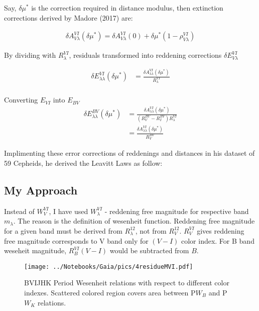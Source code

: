 \documentclass[12pt,a4paper]{article}
\begin{document}
Say, $\delta \mu ^*$ is the correction required in distance modulus, then extinction corrections derived by Madore (2017) are:

\begin{align*}
     \delta A^{VI}_{V \lambda} (\delta \mu^*) = \delta A_{V \lambda}^{VI}(0) + \delta \mu^*( 1 - \rho_{V \lambda}^{VI} )
\end{align*}

By dividing with $R_\lambda^{VI}$, residuals transformed into reddening corrections $\delta E_{V \lambda}^{VI}$

\begin{align*}
    \delta E_{\lambda \lambda}^{VI} (\delta \mu^*) & = \frac{\delta A_{\lambda \lambda}^{VI} (\delta \mu^*)}{R_\lambda^{VI}}\\
 \end{align*}
 
 Converting $E_{VI}$ into $E_{BV}$
 \begin{align*}
     \delta E_{\lambda \lambda}^{BV}(\delta \mu^*) & = \frac{\delta A_{\lambda \lambda}^{VI} (\delta \mu^*)}{({R^{BV}_V - R^{BV}_I})R_\lambda^{VI}} \\
     & = \frac{\delta A_{\lambda \lambda}^{VI}(\delta \mu^*)}{R^{BV}_V}  
 \end{align*}
 

Implimenting these error corrections of reddenings and distances in his dataset of 59 Cepheids, he derived the Leavitt Laws as  follow:

\subsection{My Approach}

Instead of $W_V^{VI}$, I have  used $W_\lambda^{VI}$ - reddening free magnitude for respective band $m_\lambda$. The reason is the definition of wesenheit function. 
Reddening free magnitude for a given band must be derived from $R_\lambda^{12}$, not from $R_V^{12}$. $R_V^{VI}$ gives reddening free 
magnitude corresponds to V band only for $(V-I)$ color index. For B band weseheit magnitude, $R_B^{VI}(V-I)$ would be subtracted from $B$. 

\begin{figure}
	\centering
	\vspace{-3.5cm}
	\texttt{[image: ../Notebooks/Gaia/pics/4residueMVI.pdf]}  
	\label{fig:del_delM}
	\caption{\small BVIJHK Period Wesenheit relations with respect to different color indexes. Scattered colored region covers area between P$W_B$ and P$W_K$ relations. }
\end{figure} 
\end{document}
